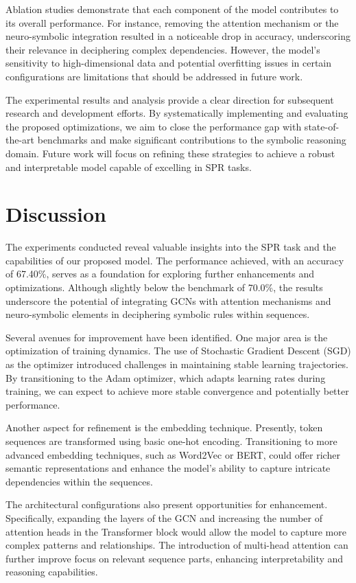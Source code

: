 \documentclass{article}
\begin{document}
Ablation studies demonstrate that each component of the model contributes to its overall performance. For instance, removing the attention mechanism or the neuro-symbolic integration resulted in a noticeable drop in accuracy, underscoring their relevance in deciphering complex dependencies. However, the model's sensitivity to high-dimensional data and potential overfitting issues in certain configurations are limitations that should be addressed in future work.

The experimental results and analysis provide a clear direction for subsequent research and development efforts. By systematically implementing and evaluating the proposed optimizations, we aim to close the performance gap with state-of-the-art benchmarks and make significant contributions to the symbolic reasoning domain. Future work will focus on refining these strategies to achieve a robust and interpretable model capable of excelling in SPR tasks.

\section{Discussion}
The experiments conducted reveal valuable insights into the SPR task and the capabilities of our proposed model. The performance achieved, with an accuracy of 67.40\%, serves as a foundation for exploring further enhancements and optimizations. Although slightly below the benchmark of 70.0\%, the results underscore the potential of integrating GCNs with attention mechanisms and neuro-symbolic elements in deciphering symbolic rules within sequences.

Several avenues for improvement have been identified. One major area is the optimization of training dynamics. The use of Stochastic Gradient Descent (SGD) as the optimizer introduced challenges in maintaining stable learning trajectories. By transitioning to the Adam optimizer, which adapts learning rates during training, we can expect to achieve more stable convergence and potentially better performance.

Another aspect for refinement is the embedding technique. Presently, token sequences are transformed using basic one-hot encoding. Transitioning to more advanced embedding techniques, such as Word2Vec or BERT, could offer richer semantic representations and enhance the model's ability to capture intricate dependencies within the sequences.

The architectural configurations also present opportunities for enhancement. Specifically, expanding the layers of the GCN and increasing the number of attention heads in the Transformer block would allow the model to capture more complex patterns and relationships. The introduction of multi-head attention can further improve focus on relevant sequence parts, enhancing interpretability and reasoning capabilities.
\end{document}
